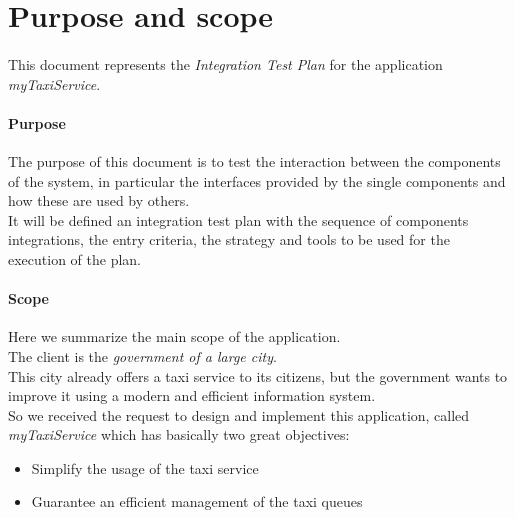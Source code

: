 \section{Purpose and scope}
\paragraph{}This document represents the \textit{Integration Test Plan} for the application \textit{myTaxiService}.
\paragraph{Purpose} The purpose of this document is to test the interaction between the components of the system, in particular the interfaces provided by the single components and how these are used by others.\\ It will be defined an integration test plan with the sequence of components integrations, the entry criteria, the strategy and tools to be used for the execution of the plan.

\paragraph{Scope} Here we summarize the main scope of the application.\\
The client is the \textit{government of a large city}.\\
This city already offers a taxi service to its citizens, but the government wants to improve it using a modern and efficient information system.\\
So we received the request to design and implement this application, called \textit{myTaxiService} which has basically two great objectives:
\begin{itemize}
\item Simplify the usage of the taxi service
\item Guarantee an efficient management of the taxi queues
\end{itemize}